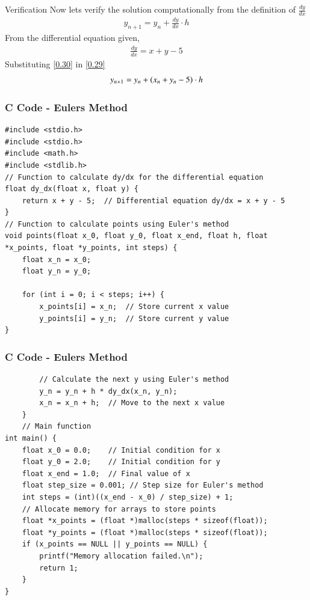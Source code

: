\documentclass{beamer}
\begin{document}
\begin{frame}{Verification}
   Now lets verify the solution computationally from the definition of $\frac{dy}{dx}$
\begin{align}
    y_{n+1}= y_{n} + \frac{dy}{dx} \cdot h
    \label{0.29}
\end{align}
From the differential equation given,
\begin{align}
    \frac{dy}{dx} = x+y-5
    \label{0.30}
\end{align}
Substituting \ref{0.30} in \ref{0.29}
\begin{align}
    y_{n+1} = y_n + \left(x_n + y_n -5\right) \cdot h 
\end{align}
\end{frame}
\begin{frame}[fragile]
    \frametitle{C Code - Eulers Method }

    \begin{lstlisting}
#include <stdio.h>
#include <stdio.h>
#include <math.h>
#include <stdlib.h>
// Function to calculate dy/dx for the differential equation
float dy_dx(float x, float y) {
    return x + y - 5;  // Differential equation dy/dx = x + y - 5
}
// Function to calculate points using Euler's method
void points(float x_0, float y_0, float x_end, float h, float *x_points, float *y_points, int steps) {
    float x_n = x_0;
    float y_n = y_0;

    for (int i = 0; i < steps; i++) {
        x_points[i] = x_n;  // Store current x value
        y_points[i] = y_n;  // Store current y value
}
    \end{lstlisting}
\end{frame}
\begin{frame}[fragile]
    \frametitle{C Code - Eulers Method}

    \begin{lstlisting}
        // Calculate the next y using Euler's method
        y_n = y_n + h * dy_dx(x_n, y_n);
        x_n = x_n + h;  // Move to the next x value
    }
    // Main function
int main() {
    float x_0 = 0.0;    // Initial condition for x
    float y_0 = 2.0;    // Initial condition for y
    float x_end = 1.0;  // Final value of x
    float step_size = 0.001; // Step size for Euler's method
    int steps = (int)((x_end - x_0) / step_size) + 1;
    // Allocate memory for arrays to store points
    float *x_points = (float *)malloc(steps * sizeof(float));
    float *y_points = (float *)malloc(steps * sizeof(float));
    if (x_points == NULL || y_points == NULL) {
        printf("Memory allocation failed.\n");
        return 1;
    }
}
\end{lstlisting}

\end{frame}
\end{document}
